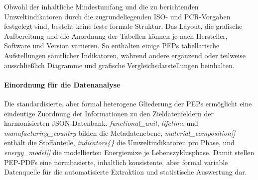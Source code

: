 Obwohl der inhaltliche Mindestumfang und die zu berichtenden Umweltindikatoren durch die zugrundeliegenden ISO- und PCR-Vorgaben festgelegt sind, besteht keine feste formale Struktur. 
Das Layout, die grafische Aufbereitung und die Anordnung der Tabellen können je nach Hersteller, Software und Version variieren. 
So enthalten einige PEPs tabellarische Aufstellungen sämtlicher Indikatoren, während andere ergänzend oder teilweise ausschließlich Diagramme und grafische Vergleichsdarstellungen beinhalten. 

\paragraph{Einordnung für die Datenanalyse}
Die standardisierte, aber formal heterogene Gliederung der PEPs ermöglicht eine eindeutige Zuordnung der Informationen zu den Zieldatenfeldern der harmonisierten JSON-Datenbank. 
\emph{functional\_unit}, \emph{lifetime} und \emph{manufacturing\_country} bilden die Metadatenebene, 
\emph{material\_composition[]} enthält die Stoffanteile, 
\emph{indicators\{\}} die Umweltindikatoren pro Phase, 
und \emph{energy\_model[]} die modellierten Energiemixe je Lebenszyklusphase. 
Damit stellen PEP-PDFs eine normbasierte, inhaltlich konsistente, aber formal variable Datenquelle für die automatisierte Extraktion und statistische Auswertung dar.

